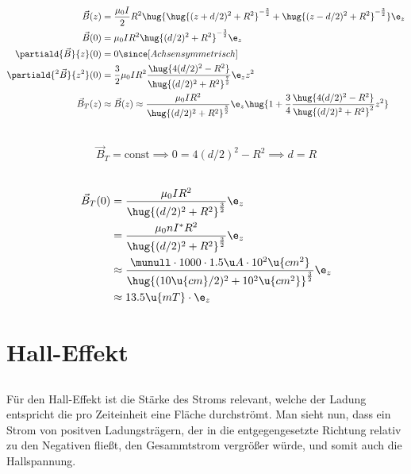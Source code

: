 \documentclass[11pt]{article}
\begin{document}
\subsection{}
\begin{align*}
    \vec B(z) &= \frac{\mu_0 I}{2} R^2 \hug{{\hug{(z+d/2)^2 + R^2}^{-\frac 32}}
    + {\hug{(z-d/2)^2 + R^2}^{-\frac 32}} } \e_z\\
    \vec B(0) &= \mu_0 I R^2 {\hug{(d/2)^2 + R^2}^{-\frac 32}}\e_z\\
    \partiald{\vec B}{z}(0) &= 0 \since[Achsensymmetrisch]\\
    \partiald{^2\vec B}{z^2}(0) &= \frac{3}{2}\mu_0 I R^2  \frac{\hug{4(d/2)^2 - R^2}}{\hug{(d/2)^2+R^2}^{\frac 72}}\e_z z^2\\
    \vec B_T(z) &\approx\vec B(z) \approx  \frac{\mu_0 I R^2}{\hug{(d/2)^2 + R^2}^{\frac 32}}\e_z \hug{1+ \frac 34 \frac{\hug{4(d/2)^2 - R^2}}{\hug{(d/2)^2+R^2}^{2}} z^2}
\end{align*}

\subsection{}
\begin{align*}
    \vec B_T = \text{const}\implies 0= {4(d/2)^2 - R^2} \implies d=R
\end{align*}

\subsection{}
\begin{align*}
    \vec B_T(0) &= \frac{\mu_0 I R^2} {\hug{(d/2)^2 + R^2}^{\frac 32}}\e_z\\
    &= \frac{\mu_0 n I^* R^2} {\hug{(d/2)^2 + R^2}^{\frac 32}}\e_z\\
    &\approx \frac{\munull \cdot 1000 \cdot 1.5\u A \cdot 10^2\u{cm^2}}{\hug{(10\u{cm}/2)^2 + 10^2\u{cm^2}}^{\frac 32}}\e_z\\
    &\approx 13.5 \u{mT}\cdot \e_z
\end{align*}


\section{Hall-Effekt}
\subsection{}
\begin{adjustwidth}{20pt}{}
    Für den Hall-Effekt ist die Stärke des Stroms relevant, welche 
    der Ladung entspricht die pro Zeiteinheit eine Fläche durchströmt. 
    Man sieht nun, dass ein Strom von positven Ladungsträgern, der in die 
    entgegengesetzte Richtung relativ zu den Negativen fließt, den Gesammtstrom vergrößer würde,
    und somit auch die Hallspannung. 
\end{adjustwidth}
\end{document}
